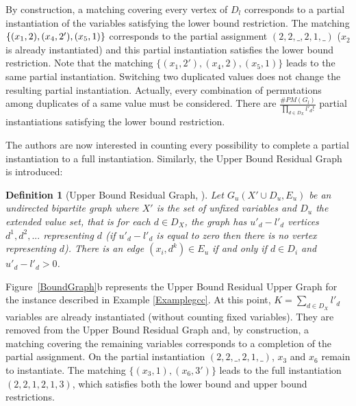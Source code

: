 \documentclass[jair,twoside,11pt,theapa]{article}
\newtheorem{definition}[theorem]{Definition}
\newcommand{\adjustedX}{X'}
\newcommand{\var}[1]{x_{#1}}
\newcommand{\Domain}{D}
\newcommand{\DX}{\Domain_{X}}
\newcommand{\domainof}[1]{\Domain_{#1}}
\newcommand{\low}{l}
\newcommand{\adjustedlow}{\low'}
\newcommand{\up}{u}
\newcommand{\adjustedup}{\up'}
\newcommand{\upperboundresidualgraph}{G_u}
\begin{document}
By construction, a matching covering every vertex of $D_l$ corresponds to a partial instantiation of the variables satisfying the lower bound restriction. The matching $\lbrace (x_1,2),(x_4,2'), \\ (x_5,1)\rbrace$ corresponds to the partial assignment $(2,2,\_,2,1,\_)$ ($x_2$ is already instantiated) and this partial instantiation satisfies the lower bound restriction. Note that the matching $\lbrace (x_1,2'),(x_4,2),(x_5,1)\rbrace$ leads to the same partial instantiation. Switching two duplicated values does not change the resulting partial instantiation. Actually, every combination of permutations among duplicates of a same value must be considered. There are $\frac{\#PM(G_l)}{\prod_{d \in D_X} l'_d !}$ partial instantiations satisfying the lower bound restriction.

The authors are now interested in counting every possibility to complete a partial instantiation to a full instantiation. Similarly, the Upper Bound Residual Graph is introduced:

\begin{definition}[Upper Bound Residual Graph, \cite{PesantQZ12}]
Let $\upperboundresidualgraph(\adjustedX \cup \Domain_u, E_u)$ be an undirected bipartite graph where $\adjustedX$ is the set of unfixed variables and $\Domain_u$ the extended value set, that is for each $d \in \DX$, the graph has $\adjustedup_d-\adjustedlow_d$ vertices $d^1,d^2,...$ representing $d$ (if $\adjustedup_d-\adjustedlow_d$ is equal to zero then there is no  vertex representing $d$). There is an edge $(\var{i}, d^k) \in E_u$ if and only if $d \in \domainof{i}$ and $\adjustedup_d-\adjustedlow_d > 0$.
\end{definition}

Figure~\ref{BoundGraph}b represents the Upper Bound Residual Upper Graph for the instance described in Example \ref{Examplegcc}. 
At this point, $K=\underset{d \in \DX}{\sum} \adjustedlow_d$ variables are already instantiated (without counting fixed variables). They are removed from the Upper Bound Residual Graph and, by construction, a matching covering the remaining variables corresponds to a completion of the partial assignment. On the partial instantiation $(2,2,\_,2,1,\_)$,  $x_3$ and $x_6$ remain to instantiate. The matching $\lbrace (x_3,1),(x_6,3') \rbrace$ leads to the full instantiation $(2,2,1,2,1,3)$, which satisfies both the lower bound and upper bound restrictions.
\end{document}
